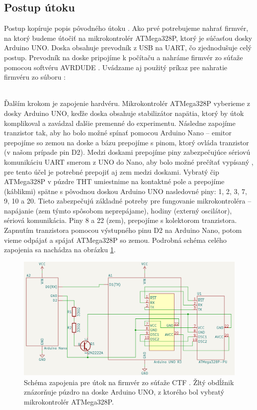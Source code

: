 \subsection{Postup útoku}
Postup kopíruje popis pôvodného útoku \cite{vccOnTheCheap}. Ako prvé potrebujeme nahrať firmvér, na ktorý budeme útočiť na mikrokontrolér ATMega328P, ktorý je súčasťou dosky Arduino UNO. Doska obsahuje prevodník z USB na UART, čo zjednodušuje celý postup. Prevodník na doske pripojíme k počítaču a nahráme firmvér zo súťaže pomocou softvéru AVRDUDE \cite{vccOnTheCheap}. Uvádzame aj použitý príkaz pre nahratie firmvéru zo súboru  \cite{vccOnTheCheap}:\\
\footnotesize {}\\
\normalsize

Ďalším krokom je zapojenie hardvéru. Mikrokontrolér ATMega328P vyberieme z dosky Arduino UNO, keďže doska obsahuje stabilizátor napätia, ktorý by útok komplikoval a zavádzal ďalšie premenné do experimentu. Následne zapojíme tranzistor tak, aby ho bolo možné spínať pomocou Arduino Nano -- emitor prepojíme so zemou na doske a bázu prepojíme s pinom, ktorý ovláda tranzistor (v našom prípade pin D2). Medzi doskami prepojíme piny zabezpečujúce sériovú komunikáciu UART smerom z UNO do Nano, aby bolo možné prečítať vypísaný , pre tento účel je potrebné prepojiť aj zem medzi doskami. Vybratý čip ATMega328P v púzdre THT umiestnime na kontaktné pole a prepojíme (káblikmi) spätne s pôvodnou doskou Arduino UNO nasledovné piny: 1, 2, 3, 7, 9, 10 a 20. Tieto zabezpečujú základné potreby pre fungovanie mikrokontroléra -- napájanie (zem týmto spôsobom neprepájame), hodiny (externý oscilátor), sériová komunikácia. Piny 8 a 22 (zem), prepojíme s kolektorom tranzistora. Zapnutím tranzistora pomocou výstupného pinu D2 na Arduino Nano, potom vieme odpájať a spájať ATMega328P so zemou. Podrobná schéma celého zapojenia sa nachádza na obrázku \ref{obr:schemeCTF}.

\begin{figure}
    \centerline{\includegraphics[width=1\textwidth]{images/schemeCTF.png}}
    \caption[Schéma zapojenia pre útok na firmvér zo súťaže CTF]{Schéma zapojenia pre útok na firmvér zo súťaže CTF \cite{vccOnTheCheap}. Žltý obdĺžnik znázorňuje púzdro na doske Arduino UNO, z ktorého bol vybratý mikrokontrolér ATMega328P.}
    \label{obr:schemeCTF}
\end{figure}


